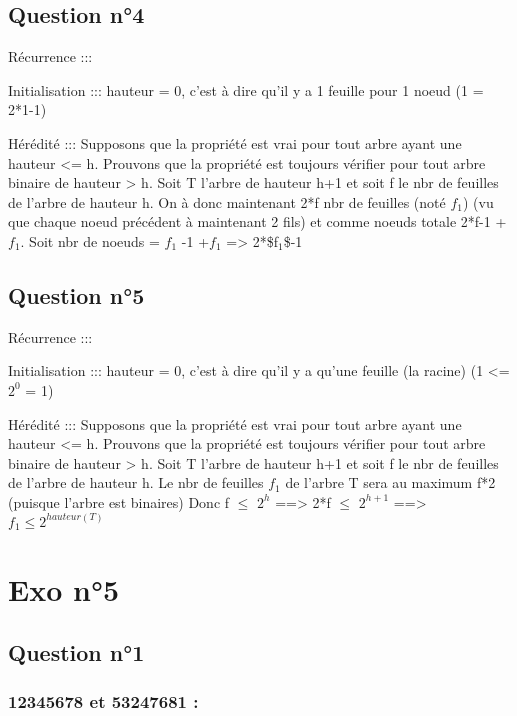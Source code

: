 \documentclass[11pt]{article}
\begin{document}
\subsection{Question n°4}
\label{sec:org99170df}

Récurrence ::: 

Initialisation :::
hauteur = 0, c'est à dire qu'il y a 1 feuille pour 1 noeud (1 = 2*1-1)

Hérédité :::
Supposons que la propriété est vrai pour tout arbre ayant une hauteur <=  h.
Prouvons que la propriété est toujours vérifier pour tout arbre binaire de hauteur > h.
Soit T l'arbre de hauteur h+1 et soit f le nbr de feuilles de l'arbre de hauteur h.
On à donc maintenant 2*f nbr de feuilles (noté \(f_1\)) (vu que chaque noeud précédent à maintenant 2 fils) et comme noeuds totale 2*f-1 + \(f_1\).
Soit nbr de noeuds = \(f_1\) -1 +\(f_1\) => 2*\$f\(_{\text{1}}\)\$-1

\subsection{Question n°5}
\label{sec:org01447ba}

Récurrence ::: 

Initialisation :::
hauteur = 0, c'est à dire qu'il y a qu'une feuille (la racine) (1 <= \(2^0\) = 1)

Hérédité :::
Supposons que la propriété est vrai pour tout arbre ayant une hauteur <=  h.
Prouvons que la propriété est toujours vérifier pour tout arbre binaire de hauteur > h.
Soit T l'arbre de hauteur h+1 et soit f le nbr de feuilles de l'arbre de hauteur h.
Le nbr de feuilles \(f_1\) de l'arbre T sera au maximum f*2 (puisque l'arbre est binaires)
Donc f \(\le\) \(2^h\) ==> 2*f \(\le\) \(2^{h+1}\) ==> \(f_1 \leq 2^{hauteur(T)}\) 

\section{Exo n°5}
\label{sec:org78686f8}

\subsection{Question n°1}
\label{sec:org17ccf0d}

\subsubsection{12345678 et 53247681 :}
\label{sec:org44f32b6}
\end{document}
